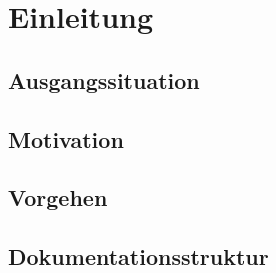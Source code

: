 \chapter{Einleitung}\label{ch:intro}

\section{Ausgangssituation}

\section{Motivation}

\section{Vorgehen}

\section{Dokumentationsstruktur}



